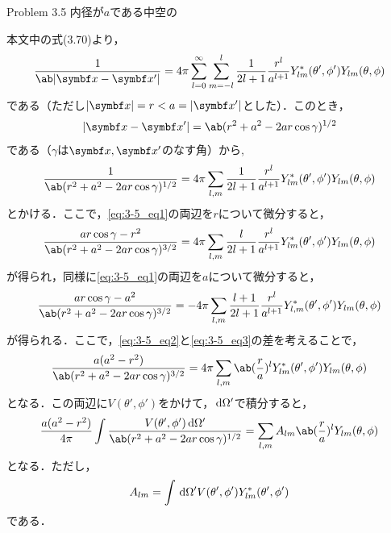   \clearpage
  \begin{bx1}{Problem 3.5}
    内径が$a$である中空の
  \end{bx1}
  本文中の式(3.70)より，
  \begin{gather}%
    \frac{1}{\ab|\bs{x}-\bs{x}'|} = 4\pi \sum_{l=0}^\infty \sum_{m=-l}^l \frac{1}{2l+1}
    \frac{r^l}{a^{l+1}} Y^*_{lm}(\theta',\phi') Y_{lm}(\theta,\phi)
  \end{gather}%
  である（ただし$|\bs{x}| = r < a = |\bs{x}'|$とした）．このとき，
  \begin{gather*}%
    |\bs{x} - \bs{x}'| = \ab(r^2 + a^2 - 2ar\cos\gamma)^{1/2}
  \end{gather*}%
  である（$\gamma$は$\bs{x}, \bs{x}'$のなす角）から,
  \begin{gather}%
    \label{eq:3-5_eq1}
    \frac{1}{\ab(r^2 + a^2 - 2ar \cos\gamma)^{1/2}} = 4\pi\sum_{l,m} \frac{1}{2l+1}
    \frac{r^l}{a^{l+1}} Y^*_{lm}(\theta',\phi') Y_{lm}(\theta,\phi)
  \end{gather}%
  とかける．ここで，\eqref{eq:3-5_eq1}の両辺を$r$について微分すると，
  \begin{gather}%
    \label{eq:3-5_eq2}
    \frac{ar\cos\gamma - r^2}{\ab(r^2+a^2-2ar\cos\gamma)^{3/2}} = 4\pi \sum_{l,m}
    \frac{l}{2l+1} \frac{r^l}{a^{l+1}} Y^*_{lm}(\theta',\phi') Y_{lm}(\theta,\phi)
  \end{gather}%
  が得られ，同様に\eqref{eq:3-5_eq1}の両辺を$a$について微分すると，
  \begin{gather}%
    \label{eq:3-5_eq3}
    \frac{ar\cos\gamma - a^2}{\ab(r^2 + a^2 -2ar\cos\gamma)^{3/2}} = 
    -4\pi\sum_{l,m}\frac{l+1}{2l+1}\frac{r^l}{a^{l+1}}
    Y^*_{l,m}(\theta',\phi') Y_{lm}(\theta,\phi)
  \end{gather}%
  が得られる．ここで，\eqref{eq:3-5_eq2}と\eqref{eq:3-5_eq3}の差を考えることで，
  \begin{gather}%
    \frac{a(a^2 - r^2)}{\ab(r^2 + a^2 - 2ar\cos\gamma)^{3/2}}
    = 4\pi \sum_{l,m} \ab(\frac r a)^l Y^*_{lm}(\theta',\phi') Y_{lm}(\theta,\phi)
  \end{gather}%
  となる．この両辺に$V(\theta',\phi')$をかけて，$\dl{\Omega'}$で積分すると，
  \begin{gather}%
    \frac{a(a^2 - r^2)}{4\pi} \int  
    \frac{V(\theta',\phi')\dl{\Omega'}}{\ab(r^2 + a^2 - 2ar\cos\gamma)^{1/2}} = 
    \sum_{l,m} A_{lm} \ab(\frac ra)^l Y_{lm}(\theta,\phi)
  \end{gather}%
  となる．ただし，
  \begin{gather}%
    A_{lm} = \int \dl{\Omega'} V(\theta',\phi') Y^*_{lm}(\theta',\phi')
  \end{gather}%
  である．

